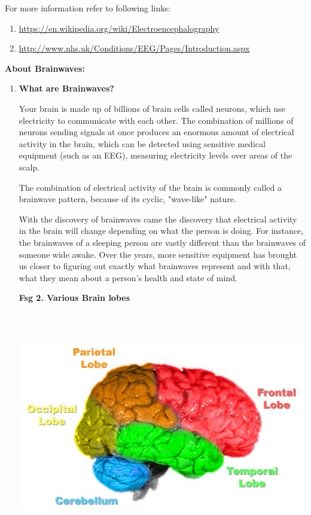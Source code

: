 \documentclass[10pt]{article}
\begin{document}
{\large For more information refer to following links:}

\begin{enumerate}
	\item {\large
\href{https://en.wikipedia.org/wiki/Electroencephalography}{https://en.wikipedia.org/wiki/Electroencephalography}}
	\item {\large
\href{http://www.nhs.uk/Conditions/EEG/Pages/Introduction.aspx}{http://www.nhs.uk/Conditions/EEG/Pages/Introduction.aspx}}
\end{enumerate}


\textbf{{\Large About Brainwaves:}}

\begin{enumerate}
	\item \textbf{{\large What are Brainwaves?}}



{\large Your brain is made up of billions of brain cells called neurons, which use electricity to communicate with each other. The combination of millions of neurons sending signals at once produces an enormous amount of electrical activity in the brain, which can be detected using sensitive medical equipment (such as an EEG), measuring electricity levels over areas of the scalp.}

{\large The combination of electrical activity of the brain is commonly called a brainwave pattern, because of its cyclic, "wave-like" nature.}

{\large With the discovery of brainwaves came the discovery that electrical activity in the brain will change depending on what the person is doing. For instance, the brainwaves of a sleeping person are vastly different than the brainwaves of someone wide awake. Over the years, more sensitive equipment has brought us closer to figuring out exactly what brainwaves represent and with that, what they mean about a person's health and state of mind.}

\begin{center}
\textbf{{\large Fsg 2. Various Brain lobes}}
\end{center}
\begin{center}
	\graphicspath{ {images/} }
	\includegraphics[width=15cm, height=10cm]{Brain-anatomy}
\end{center}


\end{enumerate}
\end{document}
